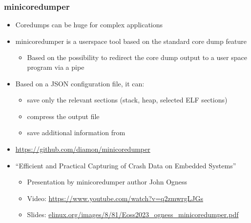 \begin{frame}
  \frametitle{minicoredumper}
  \begin{itemize}
  \item Coredumps can be huge for complex applications
  \item minicoredumper is a userspace tool based on the standard core dump
    feature
    \begin{itemize}
    \item Based on the possibility to redirect the core dump output to a
      user space program via a pipe
    \end{itemize}
  \item Based on a JSON configuration file, it can:
    \begin{itemize}
    \item save only the relevant sections (stack, heap, selected ELF
      sections)
    \item compress the output file
    \item save additional information from 
    \end{itemize}
  \item \url{https://github.com/diamon/minicoredumper}
  \item ``Efficient and Practical Capturing of Crash Data on Embedded
    Systems''
    \begin{itemize}
      \item Presentation by minicoredumper author John Ogness
      \item Video: \url{https://www.youtube.com/watch?v=q2zmwrgLJGs}
      \item Slides:
        \href{https://elinux.org/images/8/81/Eoss2023_ogness_minicoredumper.pdf}
             {elinux.org/images/8/81/Eoss2023\_ogness\_minicoredumper.pdf}
    \end{itemize}
  \end{itemize}
\end{frame}
